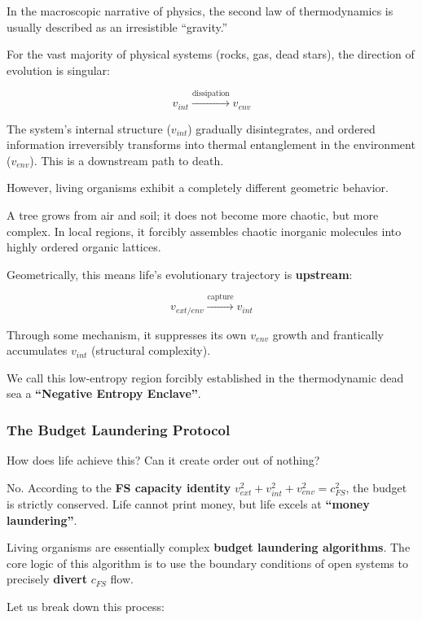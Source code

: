 In the macroscopic narrative of physics, the second law of thermodynamics is usually described as an irresistible ``gravity.''

For the vast majority of physical systems (rocks, gas, dead stars), the direction of evolution is singular:

\[v_{int} \xrightarrow{\text{dissipation}} v_{env}\]

The system's internal structure ($v_{int}$) gradually disintegrates, and ordered information irreversibly transforms into thermal entanglement in the environment ($v_{env}$). This is a downstream path to death.

However, living organisms exhibit a completely different geometric behavior.

A tree grows from air and soil; it does not become more chaotic, but more complex. In local regions, it forcibly assembles chaotic inorganic molecules into highly ordered organic lattices.

Geometrically, this means life's evolutionary trajectory is \textbf{upstream}:

\[v_{ext/env} \xrightarrow{\text{capture}} v_{int}\]

Through some mechanism, it suppresses its own $v_{env}$ growth and frantically accumulates $v_{int}$ (structural complexity).

We call this low-entropy region forcibly established in the thermodynamic dead sea a \textbf{``Negative Entropy Enclave''}.

\subsubsection{The Budget Laundering Protocol}

How does life achieve this? Can it create order out of nothing?

No. According to the \textbf{FS capacity identity} $v_{ext}^2 + v_{int}^2 + v_{env}^2 = c_{FS}^2$, the budget is strictly conserved. Life cannot print money, but life excels at \textbf{``money laundering''}.

Living organisms are essentially complex \textbf{budget laundering algorithms}. The core logic of this algorithm is to use the boundary conditions of open systems to precisely \textbf{divert} $c_{FS}$ flow.

Let us break down this process:

